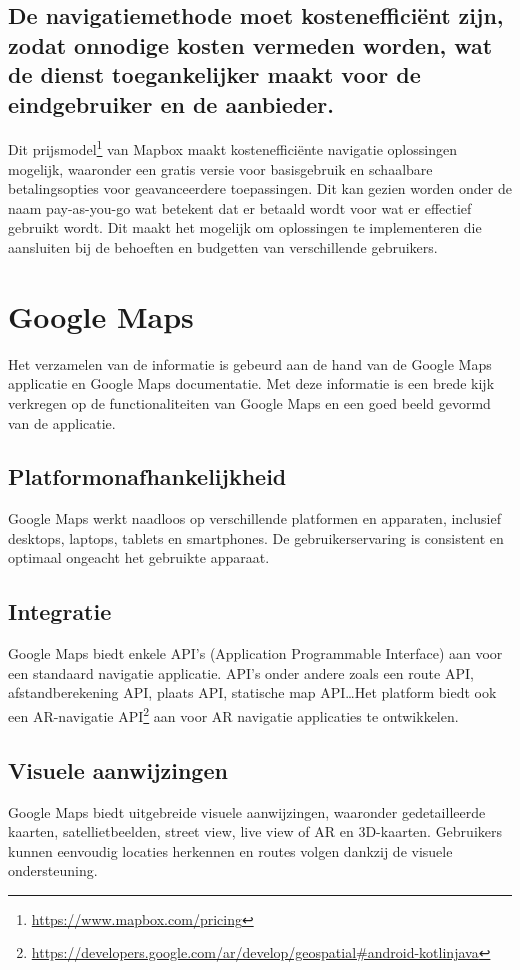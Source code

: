 \subsection*{De navigatiemethode moet kostenefficiënt zijn, zodat onnodige kosten vermeden worden, wat de dienst toegankelijker maakt voor de eindgebruiker en de aanbieder.}
Dit prijsmodel\footnote{\url{https://www.mapbox.com/pricing}} van Mapbox maakt kostenefficiënte navigatie oplossingen mogelijk, waaronder een gratis versie voor basisgebruik en schaalbare betalingsopties voor geavanceerdere toepassingen. Dit kan gezien worden onder de naam pay-as-you-go wat betekent dat er betaald wordt voor wat er effectief gebruikt wordt. Dit maakt het mogelijk om oplossingen te implementeren die aansluiten bij de behoeften en budgetten van verschillende gebruikers. 

\section{Google Maps}
\label{sec:google maps}

Het verzamelen van de informatie is gebeurd aan de hand van de Google Maps applicatie en Google Maps documentatie. Met deze informatie is een brede kijk verkregen op de functionaliteiten van Google Maps en een goed beeld gevormd van de applicatie.

\subsection*{Platformonafhankelijkheid}
Google Maps werkt naadloos op verschillende platformen en apparaten, inclusief desktops, laptops, tablets en smartphones. De gebruikerservaring is consistent en optimaal ongeacht het gebruikte apparaat.

\subsection*{Integratie}

Google Maps biedt enkele API's (Application Programmable Interface) aan voor een standaard navigatie applicatie. API's onder andere zoals een route API, afstandberekening API, plaats API, statische map API\ldots Het platform biedt ook een AR-navigatie API\footnote{\url{https://developers.google.com/ar/develop/geospatial\#android-kotlinjava}} aan voor AR navigatie applicaties te ontwikkelen.

\subsection*{Visuele aanwijzingen}
Google Maps biedt uitgebreide visuele aanwijzingen, waaronder gedetailleerde kaarten, satellietbeelden, street view, live view of AR en 3D-kaarten. Gebruikers kunnen eenvoudig locaties herkennen en routes volgen dankzij de visuele ondersteuning.

